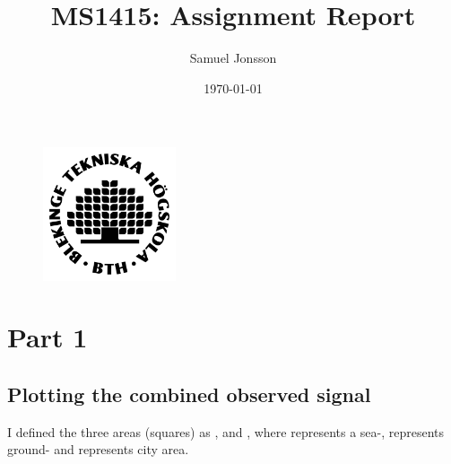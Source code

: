 \documentclass[12pt,a4paper,twoside]{article}
\author{Samuel Jonsson}
\date{\today}
\title{MS1415: Assignment Report}
\begin{document}
\maketitle

\begin{figure}[!b]
    \centering
    \includegraphics[width = 0.35\textwidth]{img/BTH_logo_black.png}
\end{figure}

\newpage

\section{Part 1}
\subsection{Plotting the combined observed signal}
\label{ssec:observedsignal}

I defined the three areas (squares) as ,  and
, where  represents a sea-,  represents ground- and 
represents city area.
\end{document}
